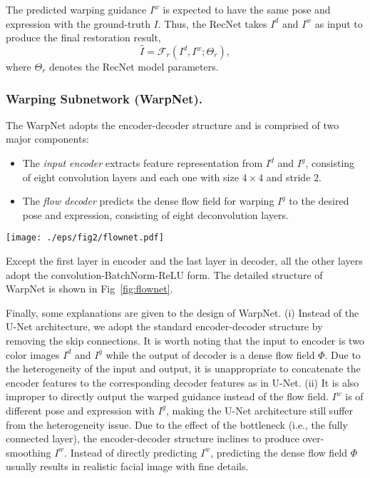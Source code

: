 \documentclass[runningheads]{llncs}
\begin{document}
The predicted warping guidance $I^{w}$ is expected to have the same pose and expression with the ground-truth $I$.
Thus, the RecNet takes $I^d$ and $I^w$ as input to produce the final restoration result,
\begin{equation}
\label{reconstruction}
\hat{I} = \mathcal{F}_r(I^d, I^w; \Theta_r),
\end{equation}
where $\Theta_r$ denotes the RecNet model parameters.

\subsubsection{Warping Subnetwork (WarpNet).}
The WarpNet adopts the encoder-decoder structure and is comprised of two major components:
\begin{itemize}
\item The \emph{input encoder} extracts feature representation from $I^{d}$ and $I^g$, consisting of eight convolution layers and each one with size $4 \times 4$ and stride $2$.
\item The \emph{flow decoder} predicts the dense flow field for warping $I^g$ to the desired pose and expression, consisting of eight deconvolution layers.
\end{itemize}
\begin{figure*}[t]
\setlength{\abovecaptionskip}{-1ex}
\setlength{\belowcaptionskip}{-2ex}
\begin{center}
\texttt{[image: ./eps/fig2/flownet.pdf]}
\end{center}
   \caption{Architecture of our WarpNet. It takes the degraded observation $I^d$ and guided image $I^g$ as input to predict the dense flow field $\Phi$, which is adopted to deform $I^g$ to the warped guidance $I^w$. $I^w$ is expected to be spatially well aligned with ground-truth $I$. Landmark loss, TV regularization as well as gradient from RecNet are deployed to facilitate the learning of WarpNet.
    }
   \label{fig:flownet}
\end{figure*}
Except the first layer in encoder and the last layer in decoder, all the other layers adopt the convolution-BatchNorm-ReLU form. The detailed structure of WarpNet is shown in Fig~\ref{fig:flownet}.


Finally, some explanations are given to the design of WarpNet.
(i) Instead of the U-Net architecture, we adopt the standard encoder-decoder structure by removing the skip connections.
It is worth noting that the input to encoder is two color images $I^d$ and $I^g$ while the output of decoder is a dense flow field $\Phi$.
Due to the heterogeneity of the input and output, it is unappropriate to concatenate the encoder features to the corresponding decoder features as in U-Net.
(ii) It is also improper to directly output the warped guidance instead of the flow field.
$I^w$ is of different pose and expression with $I^g$, making the U-Net architecture still suffer from the heterogeneity issue.
Due to the effect of the bottleneck (i.e., the fully connected layer), the encoder-decoder structure inclines to produce over-smoothing $I^w$.
Instead of directly predicting $I^w$, predicting the dense flow field $\Phi$ usually results in realistic facial image with fine details.
\end{document}
